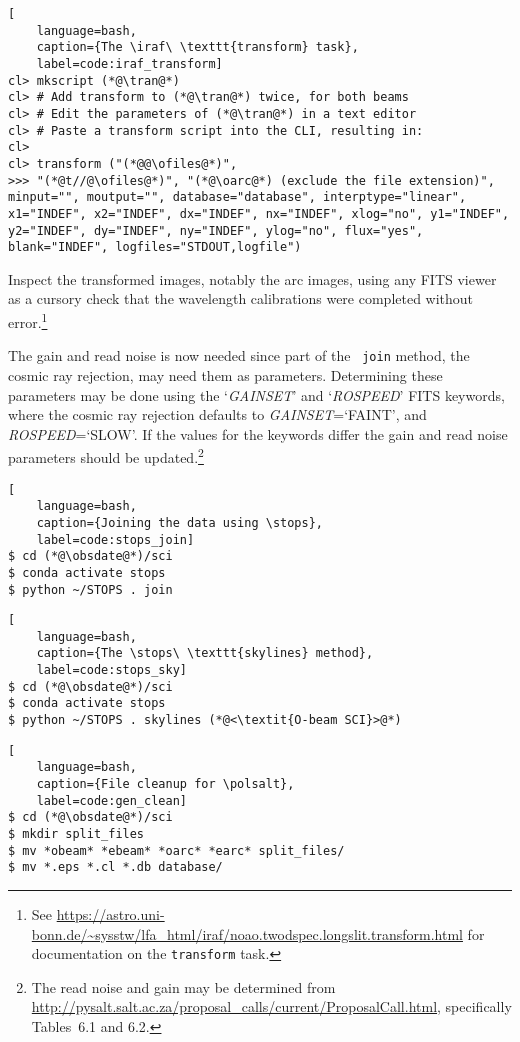 \begin{lstlisting}[
    language=bash,
    caption={The \iraf\ \texttt{transform} task},
    label=code:iraf_transform]
cl> mkscript (*@\tran@*)
cl> # Add transform to (*@\tran@*) twice, for both beams
cl> # Edit the parameters of (*@\tran@*) in a text editor
cl> # Paste a transform script into the CLI, resulting in:
cl> 
cl> transform ("(*@@\ofiles@*)",
>>> "(*@t//@\ofiles@*)", "(*@\oarc@*) (exclude the file extension)", minput="", moutput="", database="database", interptype="linear", x1="INDEF", x2="INDEF", dx="INDEF", nx="INDEF", xlog="no", y1="INDEF", y2="INDEF", dy="INDEF", ny="INDEF", ylog="no", flux="yes", blank="INDEF", logfiles="STDOUT,logfile")
\end{lstlisting}

Inspect the transformed images, notably the arc images, using any \gls{FITS} viewer as a cursory check that the wavelength calibrations were completed without error.\footnote{See \protect\url{https://astro.uni-bonn.de/~sysstw/lfa_html/iraf/noao.twodspec.longslit.transform.html} for documentation on the \texttt{transform} task.}

The gain and read noise is now needed since part of the \stops\ \texttt{join} method, the cosmic ray rejection, may need them as parameters. Determining these parameters may be done using the `\textit{GAINSET}' and `\textit{ROSPEED}' \gls{FITS} keywords, where the cosmic ray rejection defaults to \textit{GAINSET}=`FAINT', and \textit{ROSPEED}=`SLOW'. If the values for the keywords differ the gain and read noise parameters should be updated.\footnote{The read noise and gain may be determined from \protect\url{http://pysalt.salt.ac.za/proposal_calls/current/ProposalCall.html}, specifically Tables~6.1 and 6.2.}

\begin{lstlisting}[
    language=bash,
    caption={Joining the data using \stops},
    label=code:stops_join]
$ cd (*@\obsdate@*)/sci
$ conda activate stops
$ python ~/STOPS . join
\end{lstlisting}

\begin{lstlisting}[
    language=bash,
    caption={The \stops\ \texttt{skylines} method},
    label=code:stops_sky]
$ cd (*@\obsdate@*)/sci
$ conda activate stops
$ python ~/STOPS . skylines (*@<\textit{O-beam SCI}>@*)
\end{lstlisting}

\begin{lstlisting}[
    language=bash,
    caption={File cleanup for \polsalt},
    label=code:gen_clean]
$ cd (*@\obsdate@*)/sci
$ mkdir split_files
$ mv *obeam* *ebeam* *oarc* *earc* split_files/
$ mv *.eps *.cl *.db database/
\end{lstlisting}

